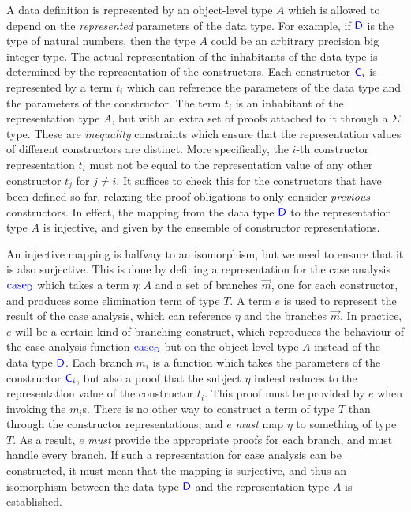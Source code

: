 A data definition is represented by an object-level type $A$ which is allowed
to depend on the \emph{represented} parameters of the data type. For example,
if ${\color{blue}{\mathsf{D}}}$ is the type of natural numbers, then the type $A$ could be an
arbitrary precision big integer type. The actual representation of the
inhabitants of the data type is determined by the representation of the
constructors. Each constructor ${\color{blue}{\mathsf{C}}}_i$ is represented by a term $t_i$ which
can reference the parameters of the data type and the parameters of the
constructor. The term $t_i$ is an inhabitant of the representation type $A$,
but with an extra set of proofs attached to it through a $\Sigma$ type. These
are \emph{inequality} constraints which ensure that the representation values
of different constructors are distinct. More specifically, the $i$-th
constructor representation $t_i$ must not be equal to the representation value
of any other constructor $t_j$ for $j \neq i$. It suffices to check this for
the constructors that have been defined so far, relaxing the proof obligations
to only consider \emph{previous} constructors. In effect, the mapping from the
data type ${\color{blue}{\mathsf{D}}}$ to the representation type $A$ is injective, and given by
the ensemble of constructor representations.

An injective mapping is halfway to an isomorphism, but we need to ensure that
it is also surjective. This is done by defining a representation for the case
analysis ${\color{blue}{\mathsf{\textrm{case}_{D}}}}$ which takes a term $\eta : A$ and a set of branches
$\vec{m}$, one for each constructor, and produces some elimination term of type
$T$. A term $e$ is used to represent the result of the case analysis, which can
reference $\eta$ and the branches $\vec{m}$. In practice, $e$ will be a certain
kind of branching construct, which reproduces the behaviour of the case
analysis function ${\color{blue}{\mathsf{\textrm{case}_{D}}}}$ but on the object-level type $A$ instead of the
data type ${\color{blue}{\mathsf{D}}}$. Each branch $m_i$ is a function which takes the parameters
of the constructor ${\color{blue}{\mathsf{C}}}_i$, but also a proof that the subject $\eta$ indeed
reduces to the representation value of the constructor $t_i$. This proof must
be provided by $e$ when invoking the $m_i$s. There is no other way to construct
a term of type $T$ than through the constructor representations, and $e$
\emph{must} map $\eta$ to something of type $T$. As a result, $e$ \emph{must}
provide the appropriate proofs for each branch, and must handle every branch.
 If such a representation for
case analysis can be constructed, it must mean that the mapping is surjective,
and thus an isomorphism between the data type ${\color{blue}{\mathsf{D}}}$ and the representation
type $A$ is established.

